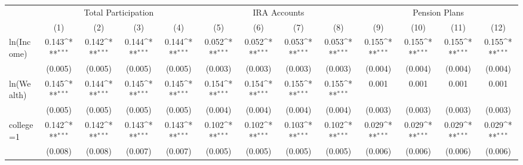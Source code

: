 {
\def\sym#1{\ifmmode^{#1}\else\(^{#1}\)\fi}
\begin{tabular*}{\linewidth}{l@{\extracolsep{\fill}}*{12}{c}}
\toprule
                &\multicolumn{4}{c}{Total Participation}                                    &\multicolumn{4}{c}{IRA Accounts}                                           &\multicolumn{4}{c}{Pension Plans}                                          \\
                &\multicolumn{1}{c}{(1)}         &\multicolumn{1}{c}{(2)}         &\multicolumn{1}{c}{(3)}         &\multicolumn{1}{c}{(4)}         &\multicolumn{1}{c}{(5)}         &\multicolumn{1}{c}{(6)}         &\multicolumn{1}{c}{(7)}         &\multicolumn{1}{c}{(8)}         &\multicolumn{1}{c}{(9)}         &\multicolumn{1}{c}{(10)}         &\multicolumn{1}{c}{(11)}         &\multicolumn{1}{c}{(12)}         \\
\midrule
ln(Income)      &    0.143\sym{***}&    0.142\sym{***}&    0.144\sym{***}&    0.144\sym{***}&    0.052\sym{***}&    0.052\sym{***}&    0.053\sym{***}&    0.053\sym{***}&    0.155\sym{***}&    0.155\sym{***}&    0.155\sym{***}&    0.155\sym{***}\\
                &  (0.005)         &  (0.005)         &  (0.005)         &  (0.005)         &  (0.003)         &  (0.003)         &  (0.003)         &  (0.003)         &  (0.004)         &  (0.004)         &  (0.004)         &  (0.004)         \\
\addlinespace
ln(Wealth)      &    0.145\sym{***}&    0.144\sym{***}&    0.145\sym{***}&    0.145\sym{***}&    0.154\sym{***}&    0.154\sym{***}&    0.155\sym{***}&    0.155\sym{***}&    0.001         &    0.001         &    0.001         &    0.001         \\
                &  (0.005)         &  (0.005)         &  (0.005)         &  (0.005)         &  (0.004)         &  (0.004)         &  (0.004)         &  (0.004)         &  (0.003)         &  (0.003)         &  (0.003)         &  (0.003)         \\
\addlinespace
college=1       &    0.142\sym{***}&    0.142\sym{***}&    0.143\sym{***}&    0.143\sym{***}&    0.102\sym{***}&    0.102\sym{***}&    0.103\sym{***}&    0.102\sym{***}&    0.029\sym{***}&    0.029\sym{***}&    0.029\sym{***}&    0.029\sym{***}\\
                &  (0.008)         &  (0.008)         &  (0.007)         &  (0.007)         &  (0.005)         &  (0.005)         &  (0.005)         &  (0.005)         &  (0.006)         &  (0.006)         &  (0.006)         &  (0.006)         \\

\end{tabular*}}
